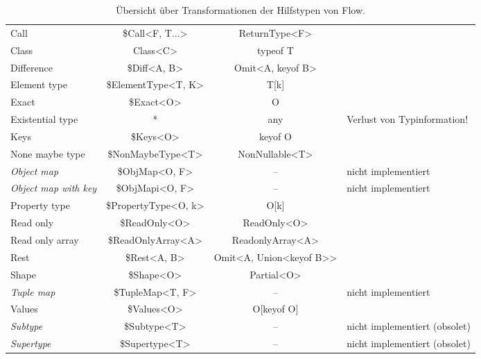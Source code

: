 \begin{table}[tbh]
  \footnotesize
  \begin{tabu} to 
    \midrule
        &      &  &  \\
    \midrule
    Call                         &  \$Call<F, T...>        & ReturnType<F>            & {} \\
    Class                        &  Class<C>               & typeof T                 & {} \\
    Difference                   &  \$Diff<A, B>           & Omit<A, keyof B>         & {} \\
    Element type                 &  \$ElementType<T, K>    & T[k]                     & {} \\
    Exact                        &  \$Exact<O>             & O                        & {} \\
    Existential type             &  *                      & any                      & Verlust von Typinformation! \\
    Keys                         &  \$Keys<O>              & keyof O                  & {} \\
    None maybe type              &  \$NonMaybeType<T>      & NonNullable<T>           & {} \\
    \textit{Object map}          &  \$ObjMap<O, F>         & --                       & nicht implementiert \\
    \textit{Object map with key} &  \$ObjMapi<O, F>        & --                       & nicht implementiert \\
    Property type                &  \$PropertyType<O, k>   & O[k]                     & {} \\
    Read only                    &  \$ReadOnly<O>          & ReadOnly<O>              & {} \\
    Read only array              &  \$ReadOnlyArray<A>     & ReadonlyArray<A>         & {} \\
    Rest                         &  \$Rest<A, B>           & Omit<A, Union<keyof B>>  & {} \\
    Shape                        &  \$Shape<O>             & Partial<O>               & {} \\
    \textit{Tuple map}           &  \$TupleMap<T, F>       & --                       & nicht implementiert \\
    Values                       &  \$Values<O>            & O[keyof O]               & {} \\
    \textit{Subtype}             &  \$Subtype<T>           & --                       & nicht implementiert (obsolet) \\
    \textit{Supertype}           &  \$Supertype<T>         & --                       & nicht implementiert (obsolet) \\
    \midrule
  \end{tabu}
  \caption{Übersicht über Transformationen der Hilfstypen von Flow.}
  \label{tab:transformation-utility-types}
\end{table}
